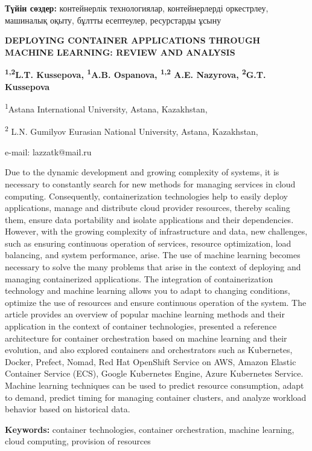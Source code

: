 {\bfseries Түйін сөздер:} контейнерлік технологиялар, контейнерлерді
оркестрлеу, машиналық оқыту, бұлтты есептеулер, ресурстарды ұсыну

\begin{center}
{\large\bfseries DEPLOYING CONTAINER APPLICATIONS THROUGH MACHINE LEARNING:
REVIEW AND ANALYSIS}

{\bfseries \textsuperscript{1,2}L.T. Kussepova\envelope, \textsuperscript{1}A.B.
Ospanova, \textsuperscript{1,2} A.E. Nazyrova, \textsuperscript{2}G.T.
Kussepova}

\textsuperscript{1}Astana International University, Astana, Kazakhstan,

\textsuperscript{2} L.N. Gumilyov Eurasian National University, Astana,
Kazakhstan,

e-mail: lazzatk@mail.ru
\end{center}

Due to the dynamic development and growing complexity of systems, it is
necessary to constantly search for new methods for managing services in
cloud computing. Consequently, containerization technologies help to
easily deploy applications, manage and distribute cloud provider
resources, thereby scaling them, ensure data portability and isolate
applications and their dependencies. However, with the growing
complexity of infrastructure and data, new challenges, such as ensuring
continuous operation of services, resource optimization, load balancing,
and system performance, arise. The use of machine learning becomes
necessary to solve the many problems that arise in the context of
deploying and managing containerized applications. The integration of
containerization technology and machine learning allows you to adapt to
changing conditions, optimize the use of resources and ensure continuous
operation of the system. The article provides an overview of popular
machine learning methods and their application in the context of
container technologies, presented a reference architecture for container
orchestration based on machine learning and their evolution, and also
explored containers and orchestrators such as Kubernetes, Docker,
Prefect, Nomad, Red Hat OpenShift Service on AWS, Amazon Elastic
Container Service (ECS), Google Kubernetes Engine, Azure Kubernetes
Service. Machine learning techniques can be used to predict resource
consumption, adapt to demand, predict timing for managing container
clusters, and analyze workload behavior based on historical data.

{\bfseries Keywords:} container technologies, container orchestration,
machine learning, cloud computing, provision of resources


